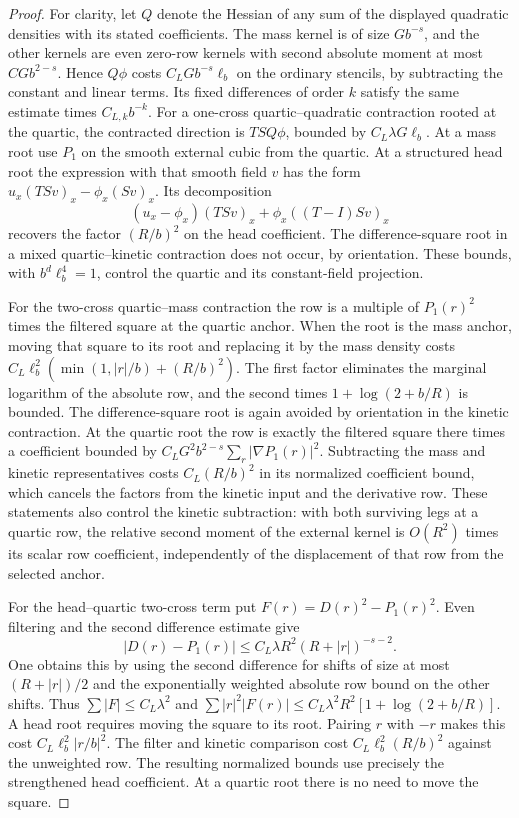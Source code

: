\documentclass[11pt]{article}
\theoremstyle{definition}
\begin{document}
\begin{proof}
For clarity, let \(Q\) denote the Hessian of any sum of the
displayed quadratic densities with its stated coefficients.
The mass kernel is of size \(G b^{-s}\), and the other kernels
are even zero-row kernels with second absolute moment at most
\(C G b^{2-s}\). Hence \(Q\phi\) costs
\(C_L G b^{-s}\ell_b\) on the ordinary stencils, by subtracting
the constant and linear terms. Its fixed differences of
order \(k\) satisfy the same estimate times \(C_{L,k}b^{-k}\).
For a one-cross quartic--quadratic contraction rooted at the
quartic, the contracted direction is \(TSQ\phi\), bounded
by \(C_L\lambda G\ell_b\). At a mass root use \(P_1\) on
the smooth external cubic from the quartic. At a structured
head root the expression with that smooth field \(v\)
has the form \(u_x(TSv)_x-\phi_x(Sv)_x\).
Its decomposition
\begin{equation}
 (u_x-\phi_x)(TSv)_x+\phi_x((T-I)Sv)_x
\end{equation}
recovers the factor \((R/b)^2\) on the head coefficient.
The difference-square root in a mixed quartic--kinetic
contraction does not occur, by orientation. These bounds,
with \(b^d\ell_b^4=1\), control the quartic and its
constant-field projection.

For the two-cross quartic--mass contraction the row is a
multiple of \(P_1(r)^2\) times the filtered square at the
quartic anchor. When the root is the mass anchor, moving that
square to its root and replacing it by the mass density
costs \(C_L\ell_b^2(\min(1,|r|/b)+(R/b)^2)\).
The first factor eliminates the marginal logarithm of the
absolute row, and the second times \(1+\log(2+b/R)\) is
bounded. The difference-square root is again avoided by
orientation in the kinetic contraction. At the quartic root
the row is exactly the filtered square there times a
coefficient bounded by
\(C_L G^2 b^{2-s}\sum_r|\nabla P_1(r)|^2\).
Subtracting the mass and kinetic representatives costs
\(C_L(R/b)^2\) in its normalized coefficient bound, which
cancels the factors from the kinetic input and the derivative
row. These statements also control the kinetic subtraction:
with both surviving legs at a quartic row, the relative
second moment of the external kernel is \(O(R^2)\) times its
scalar row coefficient, independently of the displacement of
that row from the selected anchor.

For the head--quartic two-cross term put
\(F(r)=D(r)^2-P_1(r)^2\). Even filtering and the second
difference estimate give
\begin{equation}
 |D(r)-P_1(r)|
     \le C_L\lambda R^2(R+|r|)^{-s-2}.
\end{equation}
One obtains this by using the second difference for shifts
of size at most \((R+|r|)/2\) and the exponentially
weighted absolute row bound on the other shifts. Thus
\(\sum |F|\le C_L\lambda^2\) and
\(\sum |r|^2|F(r)|\le C_L\lambda^2R^2[1+\log(2+b/R)]\).
A head root requires moving the square to its root. Pairing
\(r\) with \(-r\) makes this cost \(C_L\ell_b^2|r/b|^2\).
The filter and kinetic comparison cost
\(C_L\ell_b^2(R/b)^2\) against the unweighted row.
The resulting normalized bounds use precisely the
strengthened head coefficient. At a quartic root there
is no need to move the square.


\end{proof}
\end{document}
